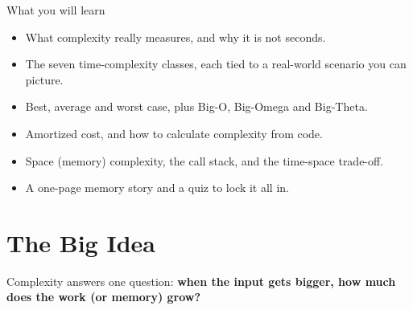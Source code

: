 \documentclass[11pt,a4paper]{article}
\begin{document}
\newpage

\begin{callout}[gold]{What you will learn}
\begin{itemize}
  \item What complexity really measures, and why it is not seconds.
  \item The seven time-complexity classes, each tied to a real-world scenario you can picture.
  \item Best, average and worst case, plus Big-O, Big-Omega and Big-Theta.
  \item Amortized cost, and how to calculate complexity from code.
  \item Space (memory) complexity, the call stack, and the time-space trade-off.
  \item A one-page memory story and a quiz to lock it all in.
\end{itemize}
\end{callout}

\tableofcontents
\vspace{4pt}

\section{The Big Idea}\label{s:big}

Complexity answers one question: \textbf{when the input gets bigger, how much does the work (or memory) grow?}
\end{document}
